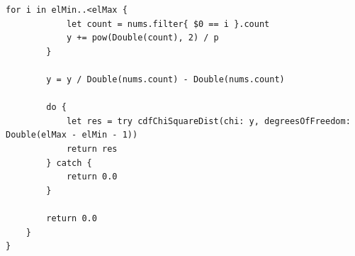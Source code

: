 \documentclass[14pt, a4paper]{extarticle}
\begin{document}
\begin{lstlisting}[caption = {Код основной программы}, label=lst:list1]
        for i in elMin..<elMax {
            let count = nums.filter{ $0 == i }.count
            y += pow(Double(count), 2) / p
        }
        
        y = y / Double(nums.count) - Double(nums.count)
        
        do {
            let res = try cdfChiSquareDist(chi: y, degreesOfFreedom: Double(elMax - elMin - 1))
            return res
        } catch {
            return 0.0
        }
        
        return 0.0
    }
}
\end{lstlisting}
\end{document}
